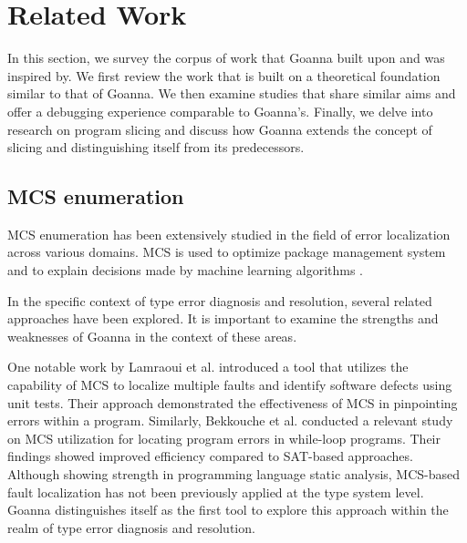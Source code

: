 \documentclass[pdflatex,sn-nature,Numbered]{sn-jnl}%
\begin{document}

\section{Related Work} 
    \label{sec:related-work}
    In this section, we survey the corpus of work that Goanna built upon and was inspired by. We first review the work that is built on a theoretical foundation similar to that of Goanna. We then examine studies that share similar aims and offer a debugging experience comparable to Goanna's. Finally, we delve into research on program slicing and discuss how Goanna extends the concept of slicing and distinguishing itself from its predecessors.

    \subsection{MCS enumeration}
	
    MCS enumeration has been extensively studied in the field of error localization across various domains. MCS is used to optimize package management system \cite{Ignatiev2014-nr} and to explain decisions made by machine learning algorithms \cite{Marques-Silva2023-nk}.
    
    
    In the specific context of type error diagnosis and resolution, several related approaches have been explored. It is important to examine the strengths and weaknesses of Goanna in the context of these areas.

    One notable work by Lamraoui et al. introduced a tool \cite{Lamraoui2016-wr} that utilizes the capability of MCS to localize multiple faults and identify software defects using unit tests. Their approach demonstrated the effectiveness of MCS in pinpointing errors within a program. Similarly, Bekkouche et al. conducted a relevant study  \cite{Bekkouche2015-is}  on MCS utilization for locating program errors in while-loop programs. Their findings showed improved efficiency compared to SAT-based approaches. Although showing strength in programming language static analysis, MCS-based fault localization has not been previously applied at the type system level. Goanna distinguishes itself as the first tool to explore this approach within the realm of type error diagnosis and resolution.
\end{document}
